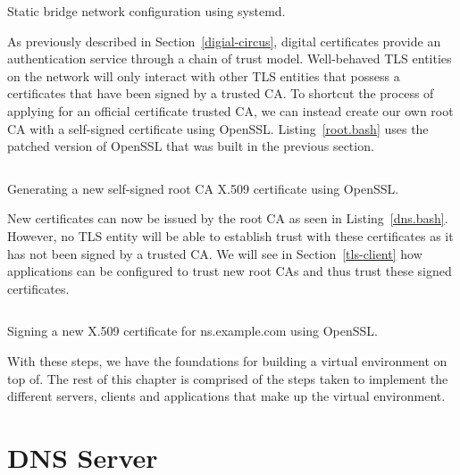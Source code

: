 \begin{listing}[ht]
\inputminted{ini}{snippets/br0.ini}
\caption[Static bridge network configuration using systemd]{Static bridge network configuration using systemd.}
\label{br0.ini}
\end{listing}

As previously described in Section~\ref{digial-circus}, digital certificates provide an authentication service through a chain of trust model. Well-behaved TLS entities on the network will only interact with other TLS entities that possess a certificates that have been signed by a trusted CA. To shortcut the process of applying for an official certificate trusted CA, we can instead create our own root CA with a self-signed certificate using OpenSSL. Listing~\ref{root.bash} uses the patched version of OpenSSL that was built in the previous section.

\begin{listing}[ht]
\inputminted{bash}{snippets/root.bash}
\caption[Generating a new self-signed root CA X.509 certificate using OpenSSL]{Generating a new self-signed root CA X.509 certificate using OpenSSL.}
\label{root.bash}
\end{listing}

New certificates can now be issued by the root CA as seen in Listing~\ref{dns.bash}. However, no TLS entity will be able to establish trust with these certificates as it has not been signed by a trusted CA. We will see in Section~\ref{tls-client} how applications can be configured to trust new root CAs and thus trust these signed certificates.

\begin{listing}[ht]
\inputminted{bash}{snippets/dns.bash}
\caption[Signing a new X.509 certificate for ns.example.com using OpenSSL]{Signing a new X.509 certificate for ns.example.com using OpenSSL.}
\label{dns.bash}
\end{listing}

With these steps, we have the foundations for building a virtual environment on top of. The rest of this chapter is comprised of the steps taken to implement the different servers, clients and applications that make up the virtual environment.










\section{DNS Server}

